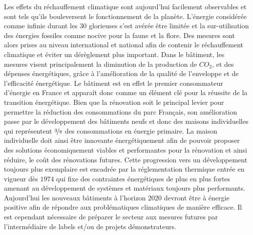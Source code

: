 
Les effets du réchauffement climatique sont aujourd’hui facilement observables et sont
tels qu’ils bouleversent le fonctionnement de la planète. L’énergie considérée comme
infinie durant les \num{30} glorieuses s’est avérée être limitée et la sur-utilisation des
énergies fossiles comme nocive pour la faune et la flore. Des mesures sont alors prises au
niveau international et national afin de contenir le réchauffement climatique et éviter un
dérèglement plus important. Dans le bâtiment, les mesures visent principalement la
diminution de la production de $CO_{2}$, et des dépenses énergétiques, grâce à
l’amélioration de la qualité de l’enveloppe et de l’efficacité énergétique. Le bâtiment
est en effet le premier consommateur d’énergie en France et apparaît donc comme un élément
clé pour la réussite de la transition énergétique. Bien que la rénovation soit le
principal levier pour permettre la réduction des consommations du parc Français, son
amélioration passe par le développement des bâtiments neufs et donc des maisons
individuelles qui représentent $\nicefrac{3}{8}$ des consommations en énergie primaire. La
maison individuelle doit ainsi être innovante énergétiquement afin de pouvoir proposer des
solutions économiquement viables et performantes pour la rénovation et ainsi réduire, le
coût des rénovations futures. Cette progression vers un développement toujours plus
exemplaire est encadrée par la réglementation thermique entrée en vigueur dès $1974$ qui
fixe des contraintes énergétiques de plus en plus fortes amenant au développement de
systèmes et matériaux toujours plus performants. Aujourd’hui les nouveaux bâtiments à
l’horizon $2020$ devront être à énergie positive afin de répondre aux problématiques
climatiques de manière efficace. Il est cependant nécessaire de préparer le secteur aux
mesures futures par l’intermédiaire de labels et/ou de projets démonstrateurs.

